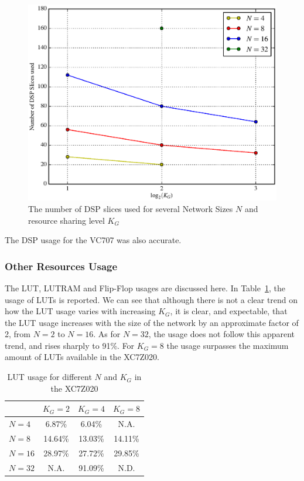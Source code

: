 \documentclass{IEEEtran}
\begin{document}
\begin{figure}
    \centering
    \includegraphics[width=\linewidth]{figures/dspuse.eps}
    \caption{The number of DSP slices used for several Network Sizes $N$ and resource sharing level $K_G$}
    \label{fig:dspused}
\end{figure}
The DSP usage for the VC707 was also accurate.

\subsubsection{Other Resources Usage}\label{sec:res-synth-otheres}
The LUT, LUTRAM and Flip-Flop usages are discussed here. In Table~\ref{tab:lut}, the usage of LUTs is reported. We can see
that although there is not a clear trend on how the LUT usage varies with increasing $K_G$, it is clear, and expectable, that
the LUT usage increases with the size of the network by an approximate factor of 2, from $N=2$ to $N=16$. As for $N=32$, the
usage does not follow this apparent trend, and rises sharply to 91\%. For $K_G = 8$ the usage surpasses the maximum amount
of LUTs available in the XC7Z020.

\begin{table}
	\caption{LUT usage for different $N$ and $K_G$ in the XC7Z020}
	\label{tab:lut}
    \centering
  \begin{tabular}{ | l | c | c | c |}
    \hline
    & $K_G=2$  & $K_G=4$ & $K_G=8$ \\
    \hline
    $N=4$ & 6.87\% & 6.04\% & N.A. \\
    \hline
    $N=8$ & 14.64\% & 13.03\% & 14.11\% \\
    \hline
    $N=16$ & 28.97\% & 27.72\% & 29.85\% \\
    \hline
    $N=32$ & N.A. & 91.09\% & N.D. \\
\hline
  \end{tabular}

\end{table}
\end{document}
